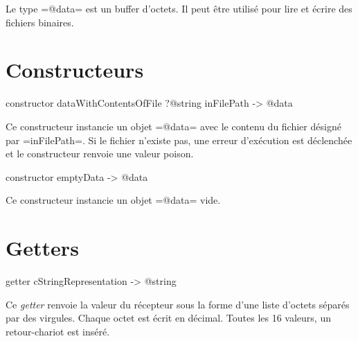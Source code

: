 

\tableDesMatieresDuChapitre


Le type \ggs=@data= est un buffer d'octets. Il peut être utilisé pour lire et écrire des fichiers binaires.




\section{Constructeurs}



\begin{galgas}
constructor dataWithContentsOfFile ?@string inFilePath -> @data
\end{galgas}

Ce constructeur instancie un objet \ggs=@data= avec le contenu du fichier désigné par \ggs=inFilePath=. Si le fichier n'existe pas, une erreur d'exécution est déclenchée et le constructeur renvoie une valeur poison.





\begin{galgas}
constructor emptyData -> @data
\end{galgas}

Ce constructeur instancie un objet \ggs=@data= vide.








\section{Getters}



\begin{galgas}
getter cStringRepresentation -> @string
\end{galgas}

Ce \emph{getter} renvoie la valeur du récepteur sous la forme d'une liste d'octets séparés par des virgules. Chaque octet est écrit en décimal. Toutes les 16 valeurs, un retour-chariot est inséré.




